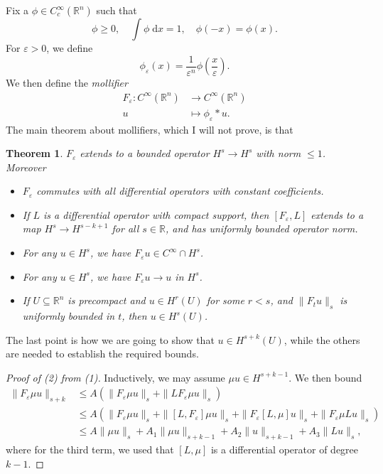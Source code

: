 \documentclass{shortart}
\newtheorem*{thm}{Theorem}
\theoremstyle{definition}
\newcommand\R{\mathbb{R}}
\renewcommand\d{\mathrm{d}}
\begin{document}
Fix a $\phi \in C_c^\infty(\R^n)$ such that
\[
  \phi \geq 0,\quad \int \phi\;\d x = 1,\quad \phi(-x) = \phi(x).
\]
For $\varepsilon > 0$, we define
\[
  \phi_\varepsilon(x) = \frac{1}{\varepsilon^n} \phi\left(\frac{x}{\varepsilon}\right).
\]
We then define the \emph{mollifier}
\begin{align*}
  F_\varepsilon: C^\infty(\R^n) &\to C^\infty(\R^n)\\
  u &\mapsto \phi_\varepsilon * u.
\end{align*}
The main theorem about mollifiers, which I will not prove, is that
\begin{thm}
  $F_\varepsilon$ extends to a bounded operator $H^s \to H^s$ with norm $\leq 1$. Moreover
  \begin{itemize}
    \item $F_\varepsilon$ commutes with all differential operators with constant coefficients.
    \item If $L$ is a differential operator with compact support, then $[F_\varepsilon, L]$ extends to a map $H^s \to H^{s - k + 1}$ for all $s \in \R$, and has uniformly bounded operator norm.
    \item For any $u \in H^s$, we have $F_\varepsilon u \in C^\infty \cap H^s$.
    \item For any $u \in H^s$, we have $F_\varepsilon u \to u$ in $H^s$.
    \item If $U \subseteq \R^n$ is precompact and $u \in H^r(U)$ for some $r < s$, and $\|F_t u\|_s$ is uniformly bounded in $t$, then $u \in H^s(U)$.\fakeqed
  \end{itemize}
\end{thm}
The last point is how we are going to show that $u \in H^{s + k}(U)$, while the others are needed to establish the required bounds.

\begin{proof}[Proof of (2) from (1)]
  Inductively, we may assume $\mu u \in H^{s + k - 1}$. We then bound
  \begin{align*}
    \|F_\varepsilon \mu u\|_{s + k} &\leq A(\|F_\varepsilon \mu u\|_s + \|L F_\varepsilon \mu u\|_s)\\
    &\leq A(\|F_\varepsilon \mu u\|_s + \|[L, F_\varepsilon] \mu u\|_s + \|F_\varepsilon [L, \mu] u\|_s + \|F_\varepsilon \mu Lu\|_s)\\
    &\leq A\|\mu u\|_s + A_1 \|\mu u\|_{s + k - 1} + A_2\|u\|_{s + k - 1} + A_3 \|Lu\|_s,
  \end{align*}
  where for the third term, we used that $[L, \mu]$ is a differential operator of degree $k - 1$.
\end{proof}
\end{document}
